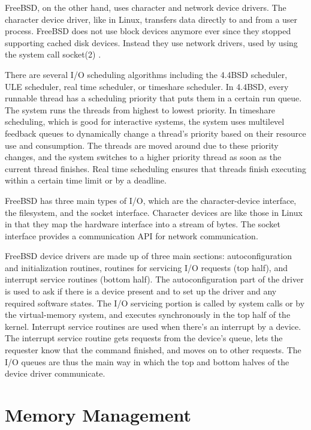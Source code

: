 \documentclass[10pt,draftclsnofoot,onecolumn,letterpaper]{IEEEtran}
\begin{document}
FreeBSD, on the other hand, uses character and network device drivers. The character device driver, like in Linux, transfers data directly to and from a user process. FreeBSD does not use block devices anymore ever since they stopped supporting cached disk devices. Instead they use network drivers, used by using the system call socket(2) \cite{12}. \par
There are several I/O scheduling algorithms including the 4.4BSD scheduler, ULE scheduler, real time scheduler, or timeshare scheduler. In 4.4BSD, every runnable thread has a scheduling priority that puts them in a certain run queue. The system runs the threads from highest to lowest priority\cite{11}. In timeshare scheduling, which is good for interactive systems, the system uses multilevel feedback queues to dynamically change a thread's priority based on their resource use and consumption. The threads are moved around due to these priority changes, and the system switches to a higher priority thread as soon as the current thread finishes\cite{13}. Real time scheduling ensures that threads finish executing within a certain time limit or by a deadline. \par
FreeBSD has three main types of I/O, which are the character-device interface, the filesystem, and the socket interface. Character devices are like those in Linux in that they map the hardware interface into a stream of bytes. The socket interface provides a communication API for network communication\cite{11}. \par
FreeBSD device drivers are made up of three main sections: autoconfiguration and initialization routines, routines for servicing I/O requests (top half), and interrupt service routines (bottom half). The autoconfiguration part of the driver is used to ask if there is a device present and to set up the driver and any required software states. The I/O servicing portion is called by system calls or by the virtual-memory system, and executes synchronously in the top half of the kernel\cite{11}. Interrupt service routines are used when there's an interrupt by a device. The interrupt service routine gets requests from the device's queue, lets the requester know that the command finished, and moves on to other requests. The I/O queues are thus the main way in which the top and bottom halves of the device driver communicate\cite{11}. \par


\section{Memory Management}
\end{document}
